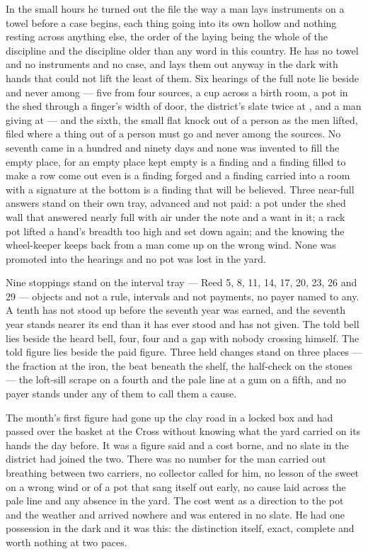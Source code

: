 In the small hours he turned out the file the way a man lays instruments on a towel before a case begins, each thing going into its own hollow and nothing resting across anything else, the order of the laying being the whole of the discipline and the discipline older than any word in this country. He has no towel and no instruments and no case, and lays them out anyway in the dark with hands that could not lift the least of them. Six hearings of the full note lie beside and never among --- five from four sources, a cup across a birth room, a pot in the shed through a finger's width of door, the district's slate twice at , and a man giving at  --- and the sixth, the small flat knock out of a person as the men lifted, filed where a thing out of a person must go and never among the sources. No seventh came in a hundred and ninety days and none was invented to fill the empty place, for an empty place kept empty is a finding and a finding filled to make a row come out even is a finding forged and a finding carried into a room with a signature at the bottom is a finding that will be believed. Three near-full answers stand on their own tray, advanced and not paid: a pot under the shed wall that answered nearly full with air under the note and a want in it; a rack pot lifted a hand's breadth too high and set down again; and the knowing the wheel-keeper keeps back from a man come up on the wrong wind. None was promoted into the hearings and no pot was lost in the yard.

Nine stoppings stand on the interval tray --- Reed 5, 8, 11, 14, 17, 20, 23, 26 and 29 --- objects and not a rule, intervals and not payments, no payer named to any. A tenth has not stood up before the seventh year was earned, and the seventh year stands nearer its end than it has ever stood and has not given. The told bell lies beside the heard bell, four, four and a gap with nobody crossing himself. The told figure lies beside the paid figure. Three held changes stand on three places --- the fraction at the iron, the beat beneath the shelf, the half-check on the stones --- the loft-sill scrape on a fourth and the pale line at a gum on a fifth, and no payer stands under any of them to call them a cause.

The month's first figure had gone up the clay road in a locked box and had passed over the basket at the Cross without knowing what the yard carried on its hands the day before. It was a figure said and a cost borne, and no slate in the district had joined the two. There was no number for the man carried out breathing between two carriers, no collector called for him, no lesson of the sweet on a wrong wind or of a pot that sang itself out early, no cause laid across the pale line and any absence in the yard. The cost went as a direction to the pot and the weather and arrived nowhere and was entered in no slate. He had one possession in the dark and it was this: the distinction itself, exact, complete and worth nothing at two paces.

